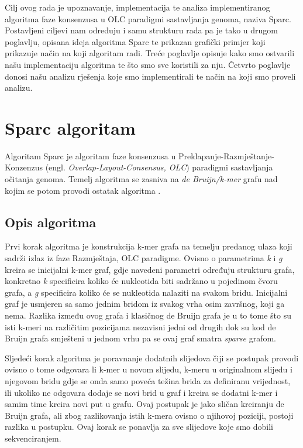 \documentclass[times, utf8, seminar, numeric]{fer}
\begin{document}
Cilj ovog rada je upoznavanje, implementacija te analiza implementiranog algoritma faze konsenzusa u OLC paradigmi sastavljanja genoma, naziva Sparc. Postavljeni ciljevi nam određuju i samu strukturu rada pa je tako u drugom poglavlju, opisana ideja algoritma Sparc te prikazan grafički primjer koji prikazuje način na koji algoritam radi. Treće poglavlje opisuje kako smo ostvarili našu implementaciju algoritma te što smo sve koristili za nju. Četvrto poglavlje donosi našu analizu rješenja koje smo implementirali te način na koji smo proveli analizu.


\chapter{Sparc algoritam}
Algoritam Sparc je algoritam faze konsenzusa u Preklapanje-Razmještanje-Konzenzus (engl. \emph{Overlap-Layout-Consensus, OLC}) paradigmi sastavljanja očitanja genoma. Temelj algoritma se zasniva na \emph{de Bruijn/k-mer} grafu nad kojim se potom provodi ostatak algoritma \cite{Ye2016}.
\section{Opis algoritma}
Prvi korak algoritma je konstrukcija k-mer grafa na temelju predanog ulaza koji sadrži izlaz iz faze Razmještaja, OLC paradigme. Ovisno o parametrima \emph{k} i \emph{g} kreira se inicijalni k-mer graf, gdje navedeni parametri određuju strukturu grafa, konkretno \emph{k} specificira koliko će nukleotida biti sadržano u pojedinom čvoru grafa, a \emph{g} specificira koliko će se nukleotida nalaziti na svakom bridu. Inicijalni graf je usmjeren sa samo jednim bridom iz svakog vrha osim završnog, koji ga nema. Razlika između ovog grafa i klasičnog de Bruijn grafa je u to tome što su isti k-meri na različitim pozicijama nezavisni jedni od drugih dok su kod de Bruijn grafa smješteni u jednom vrhu pa se ovaj graf smatra \emph {sparse} grafom. 

Sljedeći korak algoritma je poravnanje dodatnih slijedova čiji se postupak provodi ovisno o tome odgovara li k-mer u novom slijedu, k-meru u originalnom slijedu i njegovom bridu gdje se onda samo poveća težina brida za definiranu vrijednost, ili ukoliko ne odgovara dodaje se novi brid u graf i kreira se dodatni k-mer i samim time kreira novi put u grafu. Ovaj postupak je jako sličan kreiranju de Bruijn grafa, ali zbog razlikovanja istih k-mera ovisno o njihovoj poziciji, postoji razlika u postupku. Ovaj korak se ponavlja za sve slijedove koje smo dobili sekvenciranjem. 
\end{document}
